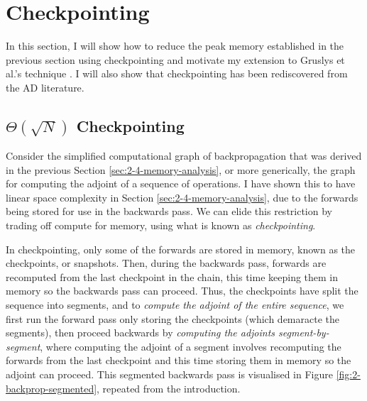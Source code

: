 \section{Checkpointing} \label{sec:2-5-bg-checkpointing}
In this section, I will show how to reduce the peak memory established in the previous section using checkpointing and motivate my extension to Gruslys et al.'s technique \cite{Gruslys2016}.
I will also show that checkpointing has been rediscovered from the AD literature.

\subsection{\texorpdfstring{\(\Theta(\sqrt{N})\)}{\textit{O(sqrt(N))}} Checkpointing}
Consider the simplified computational graph of backpropagation that was derived in the previous Section \ref{sec:2-4-memory-analysis}, or more generically, the graph for computing the adjoint of a sequence of operations.
I have shown this to have linear space complexity in Section \ref{sec:2-4-memory-analysis}, due to the forwards being stored for use in the backwards pass.
We can elide this restriction by trading off compute for memory, using what is known as \textit{checkpointing}.

In checkpointing, only some of the forwards are stored in memory, known as the checkpoints, or snapshots.
Then, during the backwards pass, forwards are recomputed from the last checkpoint in the chain, this time keeping them in memory so the backwards pass can proceed.
Thus, the checkpoints have split the sequence into segments, and
to \textit{compute the adjoint of the entire sequence}, we first run the forward pass only storing the checkpoints (which demaracte the segments),
then proceed backwards by \textit{computing the adjoints segment-by-segment},
where computing the adjoint of a segment involves recomputing the forwards from the last checkpoint and this time storing them in memory so the adjoint can proceed.
This segmented backwards pass is visualised in Figure \ref{fig:2-backprop-segmented}, repeated from the introduction.

